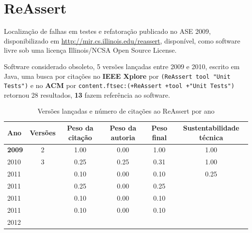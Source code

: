 \section{ReAssert}

Localização de falhas em testes e refatoração
publicado no ASE 2009,
disponibilizado em \url{http://mir.cs.illinois.edu/reassert},
disponível,
como software livre
sob uma licença Illinois/NCSA Open Source License.

Software considerado obsoleto,
5 versões lançadas
entre 2009 e 2010,
escrito em Java,
uma busca por citações no {\bf IEEE Xplore} por
\texttt{(ReAssert tool "Unit Tests")}
e no {\bf ACM} por
\texttt{content.ftsec:(+ReAssert +tool +"Unit Tests")}
retornou
28 resultados,
{\bf 13} fazem referência ao software.


\begin{table}[H]
\caption{Versões lançadas e número de citações ao ReAssert por ano}
\centering
\begin{tabular}{| l | c | c | c | c | c |}
  \hline
  Ano & Versões & Peso da citação & Peso da autoria & Peso final & Sustentabilidade técnica \\
  \hline
            {\bf 2009}
          &
          2
          &
          1.00
          &
          0.00
          &
          1.00
          &
            {\color{blue} 1.00}
          \\
\hline
            2010
          &
          3
          &
          0.25
          &
          0.25
          &
          0.31
          &
            {\color{blue} 1.00}
          \\
\hline
            2011
          &
          
          &
          0.10
          &
          0.00
          &
          0.10
          &
            {\color{red} 0.25}
          \\
            2011
          &
          
          &
          0.25
          &
          0.00
          &
          0.25
          &
          \\
            2011
          &
          
          &
          0.10
          &
          0.00
          &
          0.10
          &
          \\
            2011
          &
          
          &
          0.10
          &
          0.00
          &
          0.10
          &
          \\
\hline
            2012
          &
          

\end{tabular}
\end{table}
